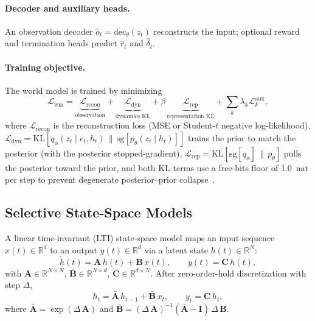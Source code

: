 \documentclass{article}
\newcommand{\R}{\mathbb{R}}
\newcommand{\KL}{\mathrm{KL}}
\newcommand{\zt}{z_t}
\newcommand{\hstate}{h_t}
\begin{document}
\paragraph{Decoder and auxiliary heads.}
An observation decoder $\hat{o}_t = \mathrm{dec}_\theta(\zt)$
reconstructs the input; optional reward and termination heads predict
$\hat{r}_t$ and $\hat{\delta}_t$.

\paragraph{Training objective.}
The world model is trained by minimizing
\begin{equation}\label{eq:world_model_loss}
  \mathcal{L}_{\text{wm}}
  = \underbrace{\mathcal{L}_{\text{recon}}}_{\text{observation}}
  + \underbrace{\mathcal{L}_{\text{dyn}}}_{\text{dynamics KL}}
  + \beta\,\underbrace{\mathcal{L}_{\text{rep}}}_{\text{representation KL}}
  + \sum_k \lambda_k \mathcal{L}_k^{\text{aux}},
\end{equation}
where $\mathcal{L}_{\text{recon}}$ is the reconstruction loss (MSE or
Student-$t$ negative log-likelihood),
$\mathcal{L}_{\text{dyn}} = \KL[q_\phi(\zt \mid e_t, \hstate)\,\|\,
\mathrm{sg}[p_\theta(\zt \mid \hstate)]]$ trains the prior to match the
posterior (with the posterior stopped-gradient),
$\mathcal{L}_{\text{rep}} = \KL[\mathrm{sg}[q_\phi]\,\|\,p_\theta]$
pulls the posterior toward the prior, and both KL terms use a free-bits
floor of 1.0~nat per step to prevent degenerate posterior--prior
collapse~\citep{hafner2023dreamerv3}.

\subsection{Selective State-Space Models}\label{sec:ssm_prelim}

A linear time-invariant (LTI) state-space model maps an input sequence
$x(t) \in \R^{d}$ to an output $y(t) \in \R^{d}$ via a latent state
$h(t) \in \R^{N}$:
\begin{equation}\label{eq:continuous_ssm}
  \dot{h}(t) = \mathbf{A}\,h(t) + \mathbf{B}\,x(t), \qquad
  y(t) = \mathbf{C}\,h(t),
\end{equation}
with $\mathbf{A} \in \R^{N \times N}$,
$\mathbf{B} \in \R^{N \times d}$,
$\mathbf{C} \in \R^{d \times N}$.
After zero-order-hold discretization with step $\Delta$,
\begin{equation}\label{eq:discrete_ssm}
  h_t = \bar{\mathbf{A}}\,h_{t-1} + \bar{\mathbf{B}}\,x_t, \qquad
  y_t = \mathbf{C}\,h_t,
\end{equation}
where $\bar{\mathbf{A}} = \exp(\Delta\,\mathbf{A})$ and
$\bar{\mathbf{B}} = (\Delta\,\mathbf{A})^{-1}
(\bar{\mathbf{A}} - \mathbf{I})\,\Delta\,\mathbf{B}$.
\end{document}
